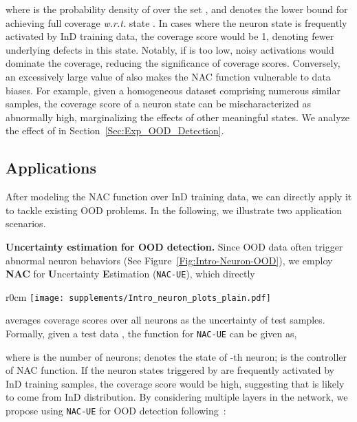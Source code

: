 \documentclass{article} \usepackage{iclr2024_conference,times}
\newcommand{\bfstart}[1]{\noindent\textbf{#1.}}
\begin{document}
where  is the probability density of  over the set , and  denotes the lower bound for 
achieving full coverage \textit{w.r.t.} state . 
In cases where the neuron state  is frequently activated by InD training data, the coverage score  would be 1, denoting fewer underlying defects in this state.
Notably, if  is too low, noisy activations would dominate the coverage, reducing the significance of coverage scores. 
Conversely, an excessively large value of  also makes the NAC function vulnerable to data biases. 
For example, given a homogeneous dataset comprising numerous similar samples, the coverage score of a neuron state  can be mischaracterized as abnormally high, marginalizing the effects of other meaningful states. We analyze the effect of  in Section~\ref{Sec:Exp_OOD_Detection}.















\subsection{Applications}
After modeling the NAC function over InD training data, we can directly apply it to tackle existing OOD problems. In the following, we illustrate two application scenarios.


\bfstart{Uncertainty estimation for OOD detection} 
Since OOD data often trigger abnormal neuron behaviors (See Figure~\ref{Fig:Intro-Neuron-OOD}), we employ \textbf{NAC} for \textbf{U}ncertainty \textbf{E}stimation (\texttt{NAC-UE}), 
which directly 
\setlength\intextsep{8pt}
\begin{wrapfigure}[17]{r}{0cm}
	\centering
	\texttt{[image: supplements/Intro\_neuron\_plots\_plain.pdf]}
	\caption{OOD~vs.~InD neuron activation states. We employ PACS~\citep{Dataset:PACS} \textit{Photo} domain as InD and \textit{Sketch} as OOD. All neurons stem from the layer4 of ResNet-50. }
\label{Fig:Intro-Neuron-OOD}
\end{wrapfigure}
averages coverage scores over all neurons as the uncertainty of test samples. 
Formally, given a test data , the function for \texttt{NAC-UE} can be given as,
\label{Sec:Method_App}

where  is the number of neurons;  denotes the state of -th neuron;  is the controller of NAC function. If the neuron states triggered by  are frequently activated by InD training samples, the coverage score  would be high, suggesting that  is likely to come from InD distribution. 
By considering multiple layers in the network, we propose using \texttt{NAC-UE} for OOD detection following~\citet{OOD_Detect:Energy,OOD_Detect:GradNorm,OOD_Detect:ReAct}: 
\end{document}

